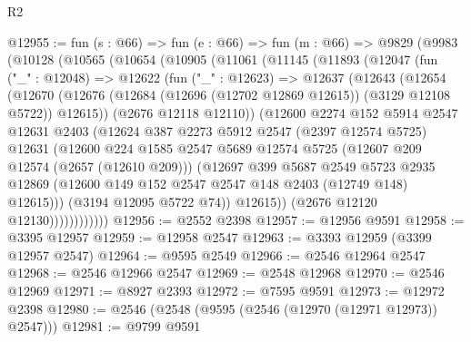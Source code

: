 \begin{lexlean}{R2}
\begin{coremodule}
@12955 := fun (s : @66) =>
  fun (e : @66) =>
  fun (m : @66) =>
  @9829
    (@9983
      (@10128
        (@10565
          (@10654
            (@10905
              (@11061
                (@11145
                  (@11893
                    (@12047
                      (fun ("_" : @12048) =>
                      @12622
                        (fun ("_" : @12623) =>
                        @12637
                          (@12643
                            (@12654
                              (@12670
                                (@12676
                                  (@12684 (@12696 (@12702 @12869 @12615)) (@3129 @12108 @5722))
                                  @12615))
                              (@2676 @12118 @12110))
                            (@12600
                              @2274
                              @152
                              @5914
                              @2547
                              @12631
                              @2403
                              (@12624
                                @387
                                @2273
                                @5912
                                @2547
                                (@2397 @12574 @5725)
                                @12631
                                (@12600
                                  @224
                                  @1585
                                  @2547
                                  @5689
                                  @12574
                                  @5725
                                  (@12607 @209 @12574 (@2657 (@12610 @209)))
                                  (@12697
                                    @399
                                    @5687
                                    @2549
                                    @5723
                                    @2935
                                    @12869
                                    (@12600 @149 @152 @2547 @2547 @148 @2403 (@12749 @148) @12615)))
                                (@3194 @12095 @5722 @74))
                              @12615))
                          (@2676 @12120 @12130))))))))))))
@12956 := @2552 @2398
@12957 := @12956 @9591
@12958 := @3395 @12957
@12959 := @12958 @2547
@12963 := @3393 @12959 (@3399 @12957 @2547)
@12964 := @9595 @2549
@12966 := @2546 @12964 @2547
@12968 := @2546 @12966 @2547
@12969 := @2548 @12968
@12970 := @2546 @12969
@12971 := @8927 @2393
@12972 := @7595 @9591
@12973 := @12972 @2398
@12980 := @2546 (@2548 (@9595 (@2546 (@12970 (@12971 @12973)) @2547)))
@12981 := @9799 @9591

\end{coremodule}
\end{lexlean}

